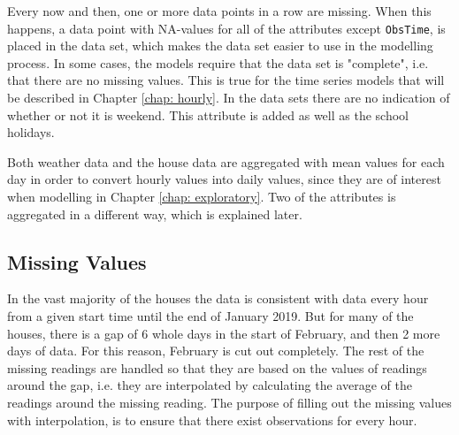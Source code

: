 \noindent Every now and then, one or more data points in a row are missing. When this happens, a data point with NA-values for all of the attributes except \texttt{ObsTime}, is placed in the data set, which makes the data set easier to use in the modelling process. In some cases, the models require that the data set is "complete", i.e. that there are no missing values. This is true for the time series models that will be described in Chapter \ref{chap: hourly}. In the data sets there are no indication of whether or not it is weekend. This attribute is added as well as the school holidays.

\noindent Both weather data and the house data are aggregated with mean values for each day in order to convert hourly values into daily values, since they are of interest when modelling in Chapter \ref{chap: exploratory}. Two of the attributes is aggregated in a different way, which is explained later.


\subsection{Missing Values}
In the vast majority of the houses the data is consistent with data every hour from a given start time until the end of January 2019. But for many of the houses, there is a gap of 6 whole days in the start of February, and then 2 more days of data. For this reason, February is cut out completely. The rest of the missing readings are handled so that they are based on the values of readings around the gap, i.e. they are interpolated by calculating the average of the readings around the missing reading.
The purpose of filling out the missing values with interpolation, is to ensure that there exist observations for every hour.


